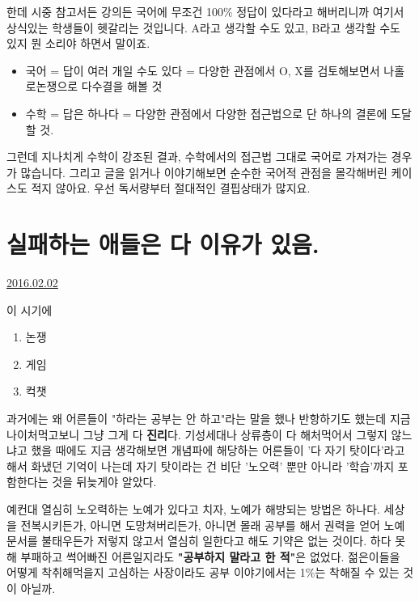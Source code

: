 한데 시중 참고서든 강의든 국어에 무조건 100$\%$ 정답이 있다라고 해버리니까 여기서 상식있는 학생들이 헷갈리는 것입니다.
A라고 생각할 수도 있고, B라고 생각할 수도 있지 뭔 소리야 하면서 말이죠.
\begin{itemize}
    \item[] 국어 = 답이 여러 개일 수도 있다 = 다양한 관점에서 O, X를 검토해보면서 나홀로논쟁으로 다수결을 해볼 것
    \item[] 수학 = 답은 하나다 = 다양한 관점에서 다양한 접근법으로 단 하나의 결론에 도달할 것.
\end{itemize}
\vspace{5mm}

그런데 지나치게 수학이 강조된 결과, 수학에서의 접근법 그대로 국어로 가져가는 경우가 많습니다.
그리고 글을 읽거나 이야기해보면 순수한 국어적 관점을 몰각해버린 케이스도 적지 않아요. 우선 독서량부터 절대적인 결핍상태가 많지요.
\vspace{5mm}





\section{실패하는 애들은 다 이유가 있음.}
\href{https://www.kockoc.com/Apoc/621373}{2016.02.02}

\vspace{5mm}

이 시기에
\vspace{5mm}
\begin{enumerate}
    \item 논쟁
    \item 게임
    \item 컥챗
\end{enumerate}
\vspace{5mm}

과거에는 왜 어른들이 "하라는 공부는 안 하고"라는 말을 했나 반항하기도 했는데
지금 나이처먹고보니 그냥 그게 다 \textbf{진리}다.
기성세대나 상류층이 다 해처먹어서 그렇지 않느냐고 했을 때에도
지금 생각해보면 개념파에 해당하는 어른들이 '다 자기 탓이다'라고 해서 화냈던 기억이 나는데
자기 탓이라는 건 비단 '노오력' 뿐만 아니라 '학습'까지 포함한다는 것을 뒤늦게야 알았다.
\vspace{5mm}

예컨대 열심히 노오력하는 노예가 있다고 치자, 노예가 해방되는 방법은 하나다.
세상을 전복시키든가, 아니면 도망쳐버리든가, 아니면 몰래 공부를 해서 권력을 얻어 노예문서를 불태우든가
저렇지 않고서 열심히 일한다고 해도 기약은 없는 것이다.
하다 못해 부패하고 썩어빠진 어른일지라도 \textbf{"공부하지 말라고 한 적"}은 없었다.
젊은이들을 어떻게 착취해먹을지 고심하는 사장이라도 공부 이야기에서는 1$\%$는 착해질 수 있는 것이 아닐까.
\vspace{5mm}


